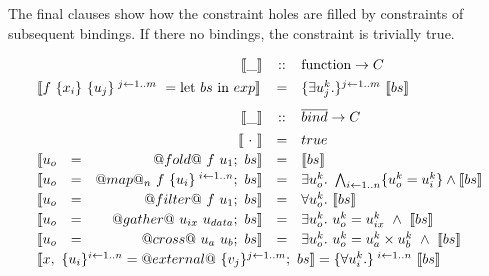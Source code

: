 The final clauses show how the constraint holes are filled by constraints of subsequent bindings. If there no bindings, the constraint is trivially true.

$$\begin{array}{lcrcl}
&&\constr{\_} & :: & \textrm{function} \rightarrow C
\\[1ex]

\multicolumn{3}{l}{
    \constr{
       f~ \{ x_i \}~ \{ u_j \}^{\; j \gets 1..m}~ 
         =  \textrm{let}~ bs~ \textrm{in}~ exp
    }
}
        & = & \{ \exists u_j^k. \}^{j \gets 1..m}
           ~\constr{bs}

\\[2ex]

&&\constr{\_} & :: & \overline{bind} \rightarrow C 
\\[1ex]

&&\constr{~ \cdot ~}    
        & = &   true                          
\\[0.5ex]

\constr{u_o &=& @fold@~ f~ u_1;~ bs}
        & = &   \constr{bs}
\\[0.5ex]

\constr{u_o &=& @map@_n~ f~ \{u_i\}^{\;i \gets 1..n};~ bs }       
        & = &   \exists u_o^k.\ \bigwedge_{i \gets 1..n}\{u_o^k = u_i^k\} 
                \wedge \constr{bs}
\\[0.5ex]

\constr{u_o &=& @filter@~ f~ u_1;~ bs}
        & = &   \forall u_o^k.\ \constr{bs}
\\[0.5ex]

\constr{u_o &=& @gather@~ u_{ix}~ u_{data};~ bs}
        & = &   \exists u_o^k.\ u_o^k = u_{ix}^k
                ~\wedge~ \constr{bs}
\\[0.5ex]

\constr{u_o &=& @cross@~ u_a~ u_b;~ bs}
        & = &   \exists u_o^k.\ u_o^k = u_a^k \times u_b^k 
                ~\wedge~ \constr{bs}
\\[0.5ex]

\multicolumn{5}{l}{
\constr{x,~ \{u_i\}^{i \gets 1..n} = @external@~ \{v_j\}^{j \gets 1..m};~ bs}
          =     \{ \forall u_i^k. \}^{\; i \gets 1..n}
                ~\constr{bs}
}
\\[0.5ex]
\end{array}$$


